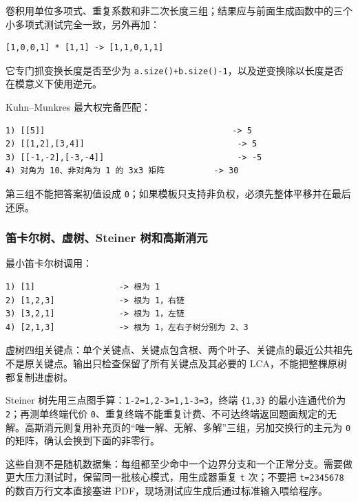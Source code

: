 卷积用单位多项式、重复系数和非二次长度三组；结果应与前面生成函数中的三个
小多项式测试完全一致，另外再加：

\begin{lstlisting}
[1,0,0,1] * [1,1] -> [1,1,0,1,1]
\end{lstlisting}

它专门抓变换长度是否至少为 \passthrough{\lstinline!a.size()+b.size()-1!}，以及逆变换除以长度是否在模意义下使用逆元。

Kuhn--Munkres 最大权完备匹配：

\begin{lstlisting}
1) [[5]]                                      -> 5
2) [[1,2],[3,4]]                               -> 5
3) [[-1,-2],[-3,-4]]                           -> -5
4) 对角为 10、非对角为 1 的 3x3 矩阵          -> 30
\end{lstlisting}

第三组不能把答案初值设成 \passthrough{\lstinline!0!}；如果模板只支持非负权，必须先整体平移并在最后还原。

\subsubsection{笛卡尔树、虚树、Steiner 树和高斯消元}

最小笛卡尔树调用：

\begin{lstlisting}
1) [1]                 -> 根为 1
2) [1,2,3]             -> 根为 1，右链
3) [3,2,1]             -> 根为 1，左链
4) [2,1,3]             -> 根为 1，左右子树分别为 2、3
\end{lstlisting}

虚树四组关键点：单个关键点、关键点包含根、两个叶子、关键点的最近公共祖先不是原关键点。输出只检查保留了所有关键点及其必要的 LCA，不能把整棵原树都复制进虚树。

Steiner 树先用三点图手算：\passthrough{\lstinline!1-2=1,2-3=1,1-3=3!}，终端 \passthrough{\lstinline!\{1,3\}!} 的最小连通代价为 \passthrough{\lstinline!2!}；再测单终端代价 \passthrough{\lstinline!0!}、重复终端不能重复计费、不可达终端返回题面规定的无解。高斯消元则复用补充页的``唯一解、无解、多解''三组，另加交换行的主元为 \passthrough{\lstinline!0!} 的矩阵，确认会换到下面的非零行。

这些自测不是随机数据集：每组都至少命中一个边界分支和一个正常分支。需要做更大压力测试时，保留同一批核心模式，用生成器重复 \passthrough{\lstinline!t!} 次；不要把 \passthrough{\lstinline!t=2345678!} 的数百万行文本直接塞进 PDF，现场测试应生成后通过标准输入喂给程序。
